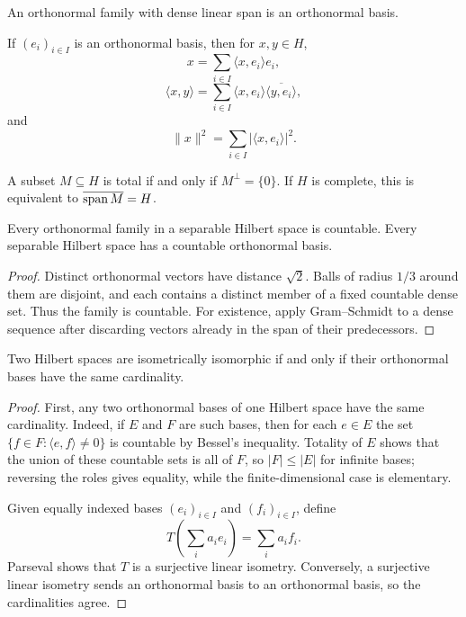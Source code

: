 \begin{notedefinition}
An orthonormal family with dense linear span is an orthonormal basis.
\end{notedefinition}

\begin{notetheorem}
If $(e_i)_{i\in I}$ is an orthonormal basis, then for $x,y\in H$,
\[
  x=\sum_{i\in I}\langle x,e_i\rangle e_i,
\]
\[
  \langle x,y\rangle
  =\sum_{i\in I}\langle x,e_i\rangle
      \overline{\langle y,e_i\rangle},
\]
and
\[
  \|x\|^2=\sum_{i\in I}|\langle x,e_i\rangle|^2.
\]
\end{notetheorem}

\begin{notetheorem}[Totality]
A subset $M\subseteq H$ is total if and only if $M^\perp=\{0\}$.  If $H$ is
complete, this is equivalent to $\overline{\operatorname{span} M}=H$.
\end{notetheorem}

\begin{notetheorem}
Every orthonormal family in a separable Hilbert space is countable.  Every
separable Hilbert space has a countable orthonormal basis.
\end{notetheorem}

\begin{proof}
Distinct orthonormal vectors have distance $\sqrt2$.  Balls of radius
$1/3$ around them are disjoint, and each contains a distinct member of a
fixed countable dense set.  Thus the family is countable.  For existence,
apply Gram--Schmidt to a dense sequence after discarding vectors already in
the span of their predecessors.
\end{proof}

\begin{notetheorem}
Two Hilbert spaces are isometrically isomorphic if and only if their
orthonormal bases have the same cardinality.
\end{notetheorem}

\begin{proof}
First, any two orthonormal bases of one Hilbert space have the same
cardinality.  Indeed, if $E$ and $F$ are such bases, then for each $e\in E$
the set $\{f\in F:\langle e,f\rangle\ne0\}$ is countable by Bessel's
inequality.  Totality of $E$ shows that the union of these countable sets is
all of $F$, so $|F|\le |E|$ for infinite bases; reversing the roles gives
equality, while the finite-dimensional case is elementary.

Given equally indexed bases $(e_i)_{i\in I}$ and $(f_i)_{i\in I}$, define
\[
  T\!\left(\sum_ia_ie_i\right)=\sum_ia_if_i.
\]
Parseval shows that $T$ is a surjective linear isometry.  Conversely, a
surjective linear isometry sends an orthonormal basis to an orthonormal basis,
so the cardinalities agree.
\end{proof}

